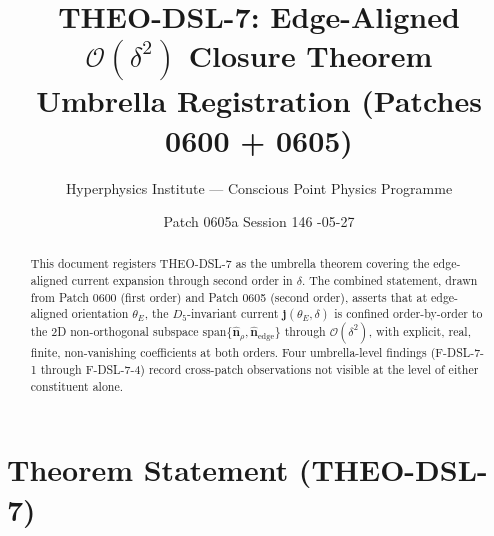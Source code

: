\documentclass[11pt]{article}
\title{THEO-DSL-7: Edge-Aligned $\mathcal{O}(\delta^2)$ Closure Theorem \\[2pt]
\large Umbrella Registration (Patches 0600 + 0605)}
\author{Hyperphysics Institute --- Conscious Point Physics Programme}
\date{Patch 0605a \quad Session 146 \quad 2026-05-27}
\begin{document}
\maketitle

\begin{abstract}
This document registers THEO-DSL-7 as the umbrella theorem covering the
edge-aligned current expansion through second order in $\delta$. The
combined statement, drawn from Patch 0600 (first order) and Patch 0605
(second order), asserts that at edge-aligned orientation $\theta_E$, the
$D_5$-invariant current $\mathbf{j}(\theta_E, \delta)$ is confined
order-by-order to the 2D non-orthogonal subspace
$\mathrm{span}\{\hat{\mathbf{n}}_\rho, \hat{\mathbf{n}}_{\text{edge}}\}$
through $\mathcal{O}(\delta^2)$, with explicit, real, finite,
non-vanishing coefficients at both orders. Four umbrella-level findings
(F-DSL-7-1 through F-DSL-7-4) record cross-patch observations not visible
at the level of either constituent alone.
\end{abstract}

\section{Theorem Statement (THEO-DSL-7)}
\end{document}
